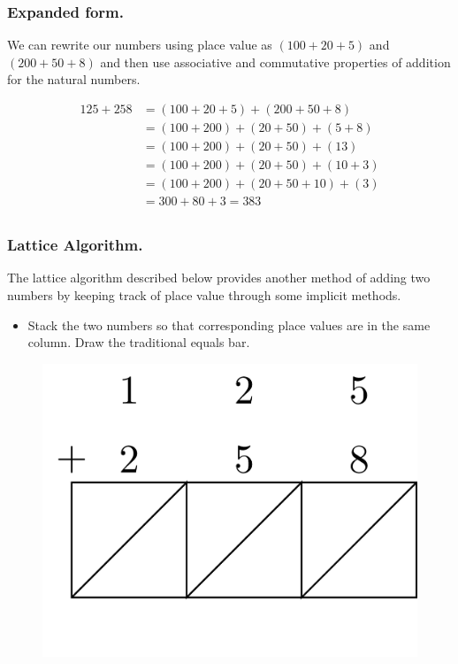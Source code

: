 \documentclass[
]{book}
\providecommand{\tightlist}{%
  \setlength{\itemsep}{0pt}\setlength{\parskip}{0pt}}
\theoremstyle{definition}
\theoremstyle{definition}
\theoremstyle{definition}
\theoremstyle{remark}
\begin{document}
\hypertarget{expanded-form.}{%
\subsubsection*{Expanded form.}\label{expanded-form.}}

We can rewrite our numbers using place value as \((100+20+5)\) and \((200+50+8)\) and then use associative and commutative properties of addition for the natural numbers.

\begin{align*}
    125+258 &= (100+20+5) + (200+50+8) \\
    &= (100+200) + (20+50) + (5+8)  \\
    &= (100+200) + (20+50) + (13) \\
    &= (100+200) + (20+50) + (10 + 3) \\
    &= (100+200) + (20+50+10) + (3) \\
    &= 300 + 80 + 3 =383 \\
\end{align*}

\hypertarget{lattice-algorithm.}{%
\subsubsection*{Lattice Algorithm.}\label{lattice-algorithm.}}

The lattice algorithm described below provides another method of adding two numbers by keeping track of place value through some implicit methods.

\begin{itemize}
\tightlist
\item
  Stack the two numbers so that corresponding place values are in the same column. Draw the traditional equals bar.
\end{itemize}

\begin{figure}

{\centering \includegraphics[width=0.2\linewidth]{tikz/lattice-addition1} 

}

\end{figure}
\end{document}
